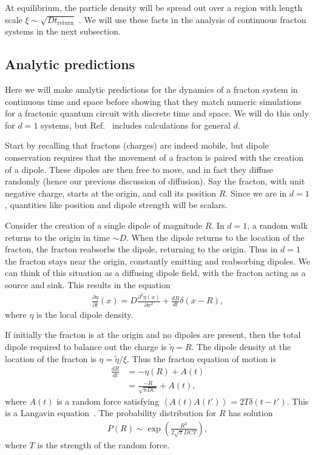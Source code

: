 \documentclass[a4paper,12pt]{article}
\newcommand{\pd}[2]{\frac{\partial #1}{\partial #2}}
\newcommand{\pdn}[3]{\frac{\partial^{#3} #1}{\partial #2^{#3}}}
\newcommand{\nd}[2]{\frac{d #1}{d #2}}
\newcommand{\ex}[1]{\left\langle #1 \right\rangle}
\newcommand{\ret}{\text{return}}
\newcommand{\note}[1]{{\color{red}{#1}}}
\begin{document}
At equilibrium, the particle density will be spread out over a region with length scale $\xi\sim\sqrt{Dt_\ret}$ \note{(Why?)}. We will use these facts in the analysis of continuous fracton systems in the next subsection.

\subsection{Analytic predictions} \label{sub:analytic}

Here we will make analytic predictions for the dynamics of a fracton system in continuous time and space before showing that they match numeric simulations for a fractonic quantum circuit with discrete time and space. We will do this only for $d=1$ systems, but Ref.~\cite{PaiFracton} includes calculations for general $d$.

Start by recalling that fractons (charges) are indeed mobile, but dipole conservation requires that the movement of a fracton is paired with the creation of a dipole. These dipoles are then free to move, and in fact they diffuse randomly (hence our previous discussion of diffusion). Say the fracton, with unit negative charge, starts at the origin, and call its position $R$. Since we are in $d=1$, quantities like position and dipole strength will be scalars.

Consider the creation of a single dipole of magnitude $R$. In $d=1$, a random walk returns to the origin in time $\sim D$.  When the dipole returns to the location of the fracton, the fracton reabsorbs the dipole, returning to the origin. Thus in $d=1$ the fracton stays near the origin, constantly emitting and reabsorbing dipoles. We can think of this situation as a diffusing dipole field, with the fracton acting as a source and sink. This results in the equation
\begin{align}
\pd{\eta}{t}(x) = D\pdn{\eta(x)}{x}{2} + \nd{R}{t}\delta(x-R),
\end{align}
where $\eta$ is the local dipole density.

If initially the fracton is at the origin and no dipoles are present, then the total dipole required to balance out the charge is $\tilde{\eta}=R$. The dipole density at the location of the fracton is $\eta = \tilde{\eta}/\xi$. Thus the fracton equation of motion is
\begin{align}
\nd{R}{t} &= -\eta(R) + A(t)\\
&= \frac{-R}{\sqrt{\pi DC}}+ A(t),
\end{align}
where $A(t)$ is a random force satisfying $\ex{A(t)A(t')} = 2T\delta(t-t')$. \note{The units are very wonky here.} This is a Langavin equation~\cite{MarenduAsp}. The probability distribution for $R$ has solution
\begin{align}
P(R) \sim \exp\left(\frac{R^2}{2\sqrt{\pi}DCT}\right),
\end{align}
where $T$ is the strength of the random force. 
\end{document}
